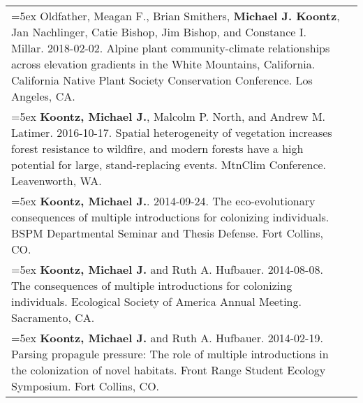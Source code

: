 \begin{longtable}{@{}>{\raggedright}p{5.25in} @{} >{\raggedleft}X@{}}
\hangindent=5ex Oldfather, Meagan F., Brian Smithers, \textbf{Michael J. Koontz}, Jan Nachlinger, Catie Bishop, Jim Bishop, and Constance I. Millar. 2018-02-02. Alpine plant community-climate relationships across elevation gradients in the White Mountains, California. California Native Plant Society Conservation Conference. Los Angeles, CA. & 2018 \tabularnewline

\hangindent=5ex \textbf{Koontz, Michael J.}, Malcolm P. North, and Andrew M. Latimer. 2016-10-17. Spatial heterogeneity of vegetation increases forest resistance to wildfire, and modern forests have a high potential for large, stand-replacing events. MtnClim Conference. Leavenworth, WA. & 2016 \tabularnewline

\hangindent=5ex \textbf{Koontz, Michael J.}. 2014-09-24. The eco-evolutionary consequences of multiple introductions for colonizing individuals. BSPM Departmental Seminar and Thesis Defense. Fort Collins, CO. & 2014 \tabularnewline

\hangindent=5ex \textbf{Koontz, Michael J.} and Ruth A. Hufbauer. 2014-08-08. The consequences of multiple introductions for colonizing individuals. Ecological Society of America Annual Meeting. Sacramento, CA. & 2014 \tabularnewline

\hangindent=5ex \textbf{Koontz, Michael J.} and Ruth A. Hufbauer. 2014-02-19. Parsing propagule pressure: The role of multiple introductions in the colonization of novel habitats. Front Range Student Ecology Symposium. Fort Collins, CO. & 2014 \tabularnewline

\end{longtable}
